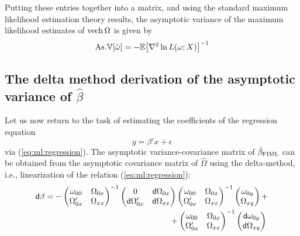 \documentclass[11pt]{asaproc}
\newcommand{\diff}{{\sf d}}
\newcommand{\Expect}{\mathbb{E}}
\newcommand{\Var}{\mathbb{V}}
\begin{document}
Putting these entries together into a matrix, and using
the standard maximum likelihood estimation theory results, the asymptotic variance
of the maximum likelihood estimates of $\mathop{\rm vech}\Omega$ is given by
\begin{equation}
    {\rm As.} \Var[ \hat\omega ] = - \Expect \bigr[ \nabla^2 \ln L(\omega;X) \bigr]^{-1}
    \label{eq:asvar:omega-hat}
\end{equation}


\subsection{The delta method derivation of the asymptotic variance of $\hat\beta$}

Let us now return to the task of estimating the coefficients of the regression equation
$$y=\beta'x + \epsilon$$
via (\ref{eq:ml:regression}). The asymptotic variance-covariance matrix of $\hat\beta_{\rm FIML}$
can be obtained from the asymptotic covariance matrix of $\hat\Omega$ using the delta-method,
i.e., linearization of the relation (\ref{eq:ml:regression}):
\begin{align}
    \diff \beta = &
    -
    \begin{pmatrix}
        \omega_{00} & \Omega_{0x} \\
        \Omega_{0x}' & \Omega_{xx}
    \end{pmatrix}^{-1}
    \begin{pmatrix}
        0 & \diff \Omega_{0x} \\
        \diff \Omega_{0x}' & \diff \Omega_{xx}
    \end{pmatrix}
    \begin{pmatrix}
        \omega_{00} & \Omega_{0x} \\
        \Omega_{0x}' & \Omega_{xx}
    \end{pmatrix}^{-1}
    \begin{pmatrix}
        \omega_{0y} \\
        \Omega_{xy}
    \end{pmatrix}
    +
    \notag \\
    & \hspace{5cm} +
    \begin{pmatrix}
        \omega_{00} & \Omega_{0x} \\
        \Omega_{0x}' & \Omega_{xx}
    \end{pmatrix}^{-1}
    \begin{pmatrix}
        \diff \omega_{0y} \\
        \diff \Omega_{xy}
    \end{pmatrix}
    \label{eq:diff:beta}
\end{align}
\end{document}
